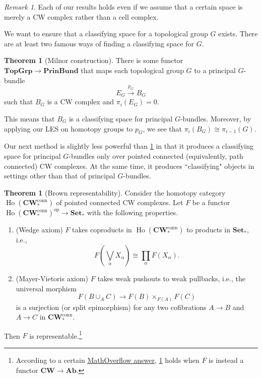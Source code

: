 \documentclass[10pt,letterpaper,cm]{nupset}
\theoremstyle{definition}
\theoremstyle{theorem}
\newtheorem{theorem}[defn]{Theorem}
\theoremstyle{remark}
\newtheorem{remark}[defn]{Remark}
\newcommand{\1}{\mathbb{1}}
\newcommand{\0}{\vec 0}
\DeclareMathOperator{\ho}{Ho}
\DeclareMathOperator{\op}{op}
\newcommand{\be}{\begin{enumerate}}
\newcommand{\ee}{\end{enumerate}}
\begin{document}
\begin{remark}
Each of our results holds even if we assume that a certain space is merely a CW complex rather than a cell complex. 
\end{remark}

\medskip

We want to ensure that a classifying space for a topological group $G$ exists. There are at least two famous ways of finding a classifying space for $G$.

\begin{theorem}[Milnor construction]\label{MC}
There is some functor $\mathbf{TopGrp} \to \mathbf{PrinBund}$ that maps each topological group $G$ to a principal $G$-bundle $$E_G \overset{p_G}{\longrightarrow} B_G$$ such that $B_G$ is a CW complex and $\pi_i\left(E_G\right) =0$.
\end{theorem}

This means that $B_G$ is a classifying space for principal $G$-bundles.
Moreover, by applying our LES on homotopy groups to $p_G$, we see that  $\pi_i\left(B_G\right) \cong \pi_{i-1}\left(G\right)$.

\medskip

Our next method is slightly less powerful than \cref{MC} in that  it produces a classifying space for principal $G$-bundles only over pointed connected (equivalently, path connected) CW complexes. At the same time, it produces ``classifying" objects in settings other than that of principal $G$-bundles.

\begin{theorem}[Brown representability]\label{BR} Consider the homotopy category $\ho(\mathbf{CW}_{\ast}^{\text{conn}})$  of pointed connected CW complexes. Let $F$ be a functor $\ho(\mathbf{CW}_{\ast}^{\text{conn}})^{\op} \to \mathbf{Set}_{\ast}$ with the following properties. 
\be[label=(\roman*)]
\item (Wedge axiom) $F$ takes coproducts in $\ho(\mathbf{CW}_{\ast}^{\text{conn}})$ to products in $\mathbf{Set}_{\ast}$, i.e., 
\[
F\left(\bigvee_{\alpha}X_{\alpha}\right) \cong \prod_{\alpha}F(X_{\alpha}).
\]
\item (Mayer-Vietoris axiom) $F$ takes weak pushouts to weak pullbacks, i.e., the universal morphism
\[
F(B\cup_A C) \to F(B)\times_{F(A)} F(C)
\] is a surjection (or split epimorphism) for any two cofibrations $A \to B$ and $A \to C$ in $\mathbf{CW}_{\ast}^{\text{conn}}$.
\ee
Then $F$ is representable.\footnote{According to a certain \href{https://mathoverflow.net/q/11523}{MathOverflow answer}, \cref{BR} holds when $F$ is instead a functor $\mathbf{CW} \to \mathbf{Ab}$.}

\end{theorem}
\end{document}

